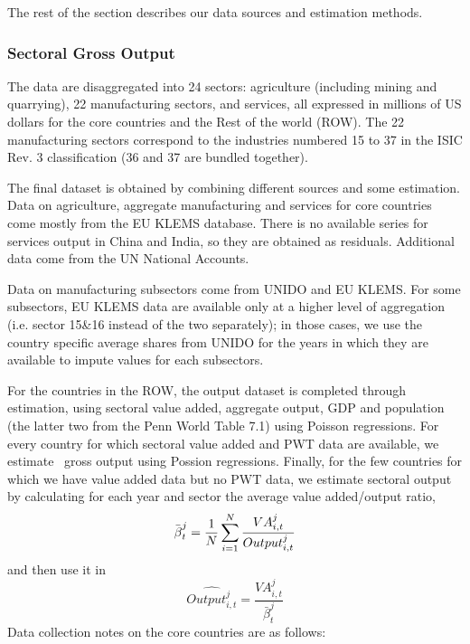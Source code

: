 \documentclass[12pt]{article}
\begin{document}
The rest of the section describes our data sources and estimation methods.

\subsubsection{Sectoral Gross Output}

The data are disaggregated into 24 sectors: agriculture (including mining
and quarrying), 22 manufacturing sectors, and services, all expressed in
millions of US dollars for the core countries and the Rest of the world
(ROW). The 22 manufacturing sectors correspond to the industries numbered 15
to 37 in the ISIC Rev. 3 classification (36 and 37 are bundled together).

The final dataset is obtained by combining different sources and some
estimation. Data on agriculture, aggregate manufacturing and services for
core countries come mostly from the EU KLEMS database. There is no available
series for services output in China and India, so they are obtained as
residuals. Additional data come from the UN National Accounts.

Data on manufacturing subsectors come from UNIDO and EU KLEMS. For some
subsectors, EU KLEMS data are available only at a higher level of
aggregation (i.e. sector 15\&16 instead of the two separately); in those
cases, we use the country specific average shares from UNIDO for the years
in which they are available to impute values for each subsectors.

For the countries in the ROW, the output dataset is completed through
estimation, using sectoral value added, aggregate output, GDP and population
(the latter two from the Penn World Table 7.1) using Poisson regressions.
For every country for which sectoral value added and PWT data are available,
we estimate \ gross output using Possion regressions. Finally, for the few
countries for which we have value added data but no PWT data, we estimate
sectoral output by calculating for each year and sector the average value
added/output ratio, 
\begin{equation*}
\bar{\beta}_{t}^{j}=\frac{1}{N}\sum_{i=1}^{N}\frac{VA_{i,t}^{j}}{%
Output_{i,t}^{j}}
\end{equation*}%
and then use it in 
\begin{equation*}
\widehat{Output_{i,t}^{j}}=\frac{VA_{i,t}^{j}}{\bar{\beta}_{t}^{j}}
\end{equation*}%
Data collection notes on the core countries are as follows:
\end{document}

